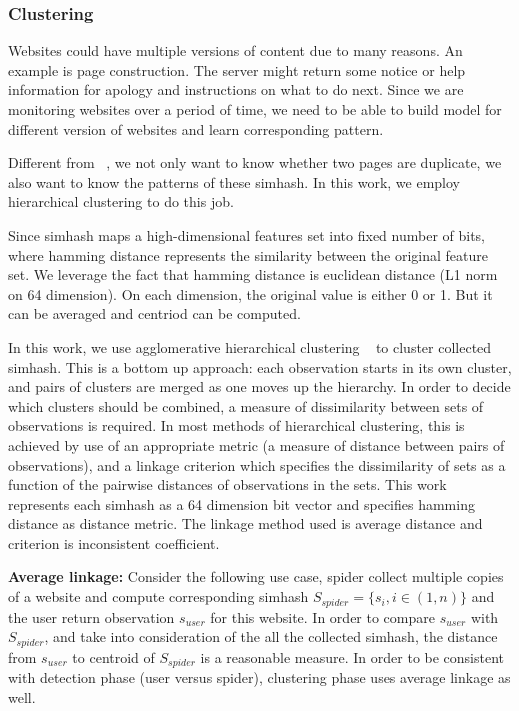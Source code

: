 \subsubsection{Clustering}
\label{sss:clustering}
Websites could have multiple versions of content due to many reasons.
An example is page construction. The server might return some notice or help
information for apology and instructions on what to do next.
Since we are monitoring websites over a period of time, we need to be able to
build model for different version of websites and learn corresponding pattern.

Different from ~\cite{manku2007detecting}, we not only want to know whether two pages are
duplicate, we also want to know the patterns of these simhash. In this work, we employ
hierarchical clustering to do this job.

Since simhash maps a high-dimensional
features set into fixed number of bits, where hamming distance represents the
similarity between the original feature set. We leverage the fact that hamming
distance is euclidean distance (L1 norm on 64 dimension). On each dimension, the
original value is either 0 or 1. But it can be averaged and centriod can be
computed.

In this work, we use agglomerative hierarchical clustering ~\cite{jones2014scipy} to cluster
collected simhash. This is a bottom up approach: each observation starts in its
own cluster, and pairs of clusters are merged as one moves up the hierarchy.
In order to decide which clusters should be combined, a measure of dissimilarity
between sets of observations is required. In most methods of hierarchical
clustering, this is achieved by use of an appropriate metric (a measure of
distance between pairs of observations), and a linkage criterion which specifies
the dissimilarity of sets as a function of the pairwise distances of
observations in the sets. This work represents each simhash as a 64 dimension
bit vector and specifies hamming distance as distance metric. The linkage method
used is average distance and criterion is inconsistent coefficient.

{\bf Average linkage:} 
Consider the following use case, spider collect
multiple copies of a website and compute corresponding simhash $S_{spider} = \{s_{i}, i \in
(1,n)\}$ and the user return observation $s_{user}$ for this website. In order to
compare $s_{user}$ with $S_{spider}$, and take into consideration of the all the
collected simhash, the distance from $s_{user}$ to centroid of $S_{spider}$ is a
reasonable measure. In order to be consistent with detection phase (user versus
spider), clustering phase uses average linkage as well.

